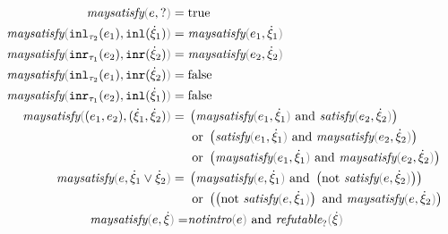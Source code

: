 \begin{subequations}\label{defn:maysatisfy}
  \begin{align}
    \fmaysatisfy{e}{\cunknown} ={}& \true \label{defn:maysat-unknown}\\
    \fmaysatisfy{\hinl{\tau_2}{e_1}}{\cinl{\hxi_1}} ={}& \fmaysatisfy{e_1}{\hxi_1} \label{defn:maysat-inl}\\
    \fmaysatisfy{\hinr{\tau_1}{e_2}}{\cinr{\hxi_2}} ={}& \fmaysatisfy{e_2}{\hxi_2} \label{defn:maysat-inr}\\
    \fmaysatisfy{\hinl{\tau_2}{e_1}}{\cinr{\hxi_2}} ={}& \false \label{defn:not-inl-maysat-inr}\\
    \fmaysatisfy{\hinr{\tau_1}{e_2}}{\cinl{\hxi_1}} ={}& \false \label{defn:not-inr-maysat-inl}\\
    \fmaysatisfy{\hpair{e_1}{e_2}}{\cpair{\hxi_1}{\hxi_2}} ={}& \left(\fmaysatisfy{e_1}{\hxi_1} \textand \fsatisfy{e_2}{\hxi_2}\right) \notag\\
    &\textor \left(\fsatisfy{e_1}{\hxi_1} \textand \fmaysatisfy{e_2}{\hxi_2}\right) \notag\\
    &\textor \left(\fmaysatisfy{e_1}{\hxi_1} \textand \fmaysatisfy{e_2}{\hxi_2}\right) \label{defn:maysat-pair}\\
    \fmaysatisfy{e}{\cor{\hxi_1}{\hxi_2}} ={}& \left(\fmaysatisfy{e}{\hxi_1} \textand \left(\textnot \fsatisfy{e}{\hxi_2}\right)\right) \notag\\
    &\textor \left(\left(\textnot \fsatisfy{e}{\hxi_1}\right) \textand \fmaysatisfy{e}{\hxi_2}\right) \label{defn:maysat-or}\\
    \fmaysatisfy{e}{\hxi} =& \fnotIntro{e} \textand \frefutable{\hxi} \label{defn:notintro-maysat-refutable}
  \end{align}
\end{subequations}


